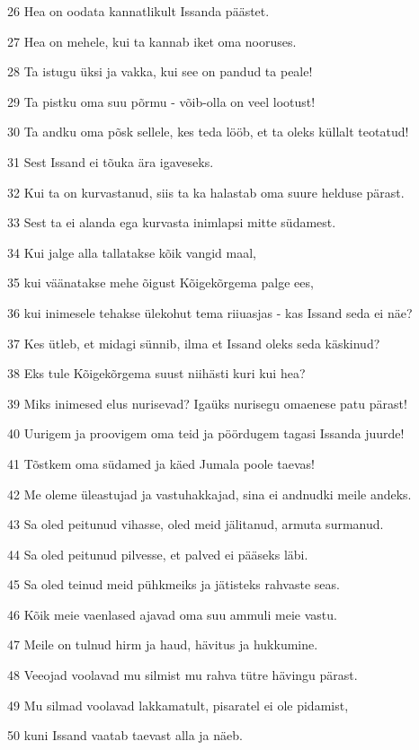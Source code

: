 \par 26 Hea on oodata kannatlikult Issanda päästet.
\par 27 Hea on mehele, kui ta kannab iket oma nooruses.
\par 28 Ta istugu üksi ja vakka, kui see on pandud ta peale!
\par 29 Ta pistku oma suu põrmu - võib-olla on veel lootust!
\par 30 Ta andku oma põsk sellele, kes teda lööb, et ta oleks küllalt teotatud!
\par 31 Sest Issand ei tõuka ära igaveseks.
\par 32 Kui ta on kurvastanud, siis ta ka halastab oma suure helduse pärast.
\par 33 Sest ta ei alanda ega kurvasta inimlapsi mitte südamest.
\par 34 Kui jalge alla tallatakse kõik vangid maal,
\par 35 kui väänatakse mehe õigust Kõigekõrgema palge ees,
\par 36 kui inimesele tehakse ülekohut tema riiuasjas - kas Issand seda ei näe?
\par 37 Kes ütleb, et midagi sünnib, ilma et Issand oleks seda käskinud?
\par 38 Eks tule Kõigekõrgema suust niihästi kuri kui hea?
\par 39 Miks inimesed elus nurisevad? Igaüks nurisegu omaenese patu pärast!
\par 40 Uurigem ja proovigem oma teid ja pöördugem tagasi Issanda juurde!
\par 41 Tõstkem oma südamed ja käed Jumala poole taevas!
\par 42 Me oleme üleastujad ja vastuhakkajad, sina ei andnudki meile andeks.
\par 43 Sa oled peitunud vihasse, oled meid jälitanud, armuta surmanud.
\par 44 Sa oled peitunud pilvesse, et palved ei pääseks läbi.
\par 45 Sa oled teinud meid pühkmeiks ja jätisteks rahvaste seas.
\par 46 Kõik meie vaenlased ajavad oma suu ammuli meie vastu.
\par 47 Meile on tulnud hirm ja haud, hävitus ja hukkumine.
\par 48 Veeojad voolavad mu silmist mu rahva tütre hävingu pärast.
\par 49 Mu silmad voolavad lakkamatult, pisaratel ei ole pidamist,
\par 50 kuni Issand vaatab taevast alla ja näeb.
